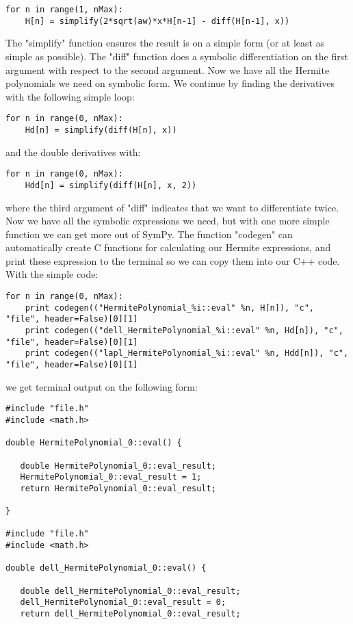 \documentclass[../main.tex]{subfiles}
\begin{document}
\begin{appendices}
\begin{lstlisting}[caption={}]
for n in range(1, nMax):
	H[n] = simplify(2*sqrt(aw)*x*H[n-1] - diff(H[n-1], x))
\end{lstlisting}
The "simplify" function ensures the result is on a simple form (or at least as simple as possible). The "diff" function does a symbolic differentiation on the first argument with respect to the second argument. Now we have all the Hermite polynomials we need on symbolic form. We continue by finding the derivatives with the following simple loop:
\lstset{language=python}
\begin{lstlisting}[caption={}]
for n in range(0, nMax):
	Hd[n] = simplify(diff(H[n], x))
\end{lstlisting}
and the double derivatives with:
\lstset{language=python}
\begin{lstlisting}[caption={}]
for n in range(0, nMax):
	Hdd[n] = simplify(diff(H[n], x, 2))
\end{lstlisting}
where the third argument of "diff" indicates that we want to differentiate twice. Now we have all the symbolic expressions we need, but with one more simple function we can get more out of SymPy. The function "codegen" can automatically create C functions for calculating our Hermite expressions, and print these expression to the terminal so we can copy them into our C++ code. With the simple code:
\lstset{language=python}
\begin{lstlisting}[caption={}]
for n in range(0, nMax):
	print codegen(("HermitePolynomial_%i::eval" %n, H[n]), "c", "file", header=False)[0][1]
	print codegen(("dell_HermitePolynomial_%i::eval" %n, Hd[n]), "c", "file", header=False)[0][1]
	print codegen(("lapl_HermitePolynomial_%i::eval" %n, Hdd[n]), "c", "file", header=False)[0][1]
\end{lstlisting}
we get terminal output on the following form:
\begin{lstlisting}[caption={}, style=Bash]
#include "file.h"
#include <math.h>

double HermitePolynomial_0::eval() {

   double HermitePolynomial_0::eval_result;
   HermitePolynomial_0::eval_result = 1;
   return HermitePolynomial_0::eval_result;

}

#include "file.h"
#include <math.h>

double dell_HermitePolynomial_0::eval() {

   double dell_HermitePolynomial_0::eval_result;
   dell_HermitePolynomial_0::eval_result = 0;
   return dell_HermitePolynomial_0::eval_result;


\end{lstlisting}
\end{appendices}
\end{document}
